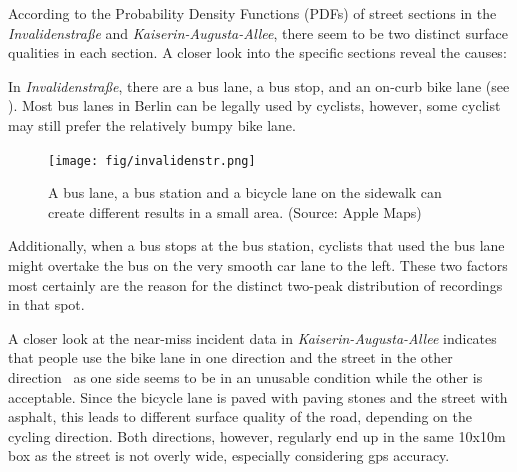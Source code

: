 According to the Probability Density Functions (PDFs) of street sections in the \textit{Invalidenstraße} and \textit{Kaiserin-Augusta-Allee}, there seem to be two distinct surface qualities in each section.
A closer look into the specific sections reveal the causes:
 
\begin{table}%
\centering
\caption{Surface Quality Analysis Evaluation Results Showing Mean, Median and Standard Deviation of Sections With Mixed Results}%
\label{tab:mixed}
\end{table}

In \textit{Invalidenstraße}, there are a bus lane, a bus stop, and an on-curb bike lane (see ).
Most bus lanes in Berlin can be legally used by cyclists, however, some cyclist may still prefer the relatively bumpy bike lane.
\begin{figure}
    \centering
    \texttt{[image: fig/invalidenstr.png]}
    \caption{%
        A bus lane, a bus station and a bicycle lane on the sidewalk can create different results in a small area. (Source: Apple Maps)
    }%
    \label{fig:invaliden}
\end{figure}
Additionally, when a bus stops at the bus station, cyclists that used the bus lane might overtake the bus on the very smooth car lane to the left. 
These two factors most certainly are the reason for the distinct two-peak distribution of recordings in that spot.

A closer look at the near-miss incident data in \textit{Kaiserin-Augusta-Allee} indicates that people use the bike lane in one direction and the street in the other direction~\cite{dataset_simra_set1,dataset_simra_set2,dataset_simra_set3} as one side seems to be in an unusable condition while the other is acceptable.
Since the bicycle lane is paved with paving stones and the street with asphalt, this leads to different surface quality of the road, depending on the cycling direction.
Both directions, however, regularly end up in the same 10x10m box as the street is not overly wide, especially considering \ac{gps} accuracy.

